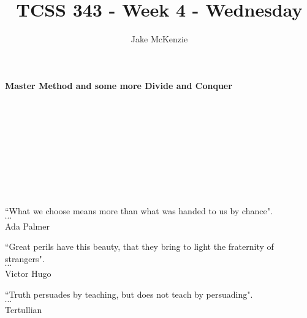 \documentclass[12pt]{article}
\begin{document}
\title{TCSS 343 - Week 4 - Wednesday}
\author{Jake McKenzie}
\maketitle
\noindent\centerline{\textbf{Master Method and some more Divide and Conquer}}\\\\\\\\\\\\\\\\
\begin{center}
    ``What we choose means more than what was handed to us by chance". \\$\cdots$\\ Ada Palmer
\end{center}
\begin{center}
    ``Great perils have this beauty, that they bring to light the fraternity of strangers". \\$\cdots$\\ Victor Hugo
\end{center}
\begin{center}
    ``Truth persuades by teaching, but does not teach by persuading". \\$\cdots$\\ Tertullian 
\end{center}
\newpage
\end{document}
